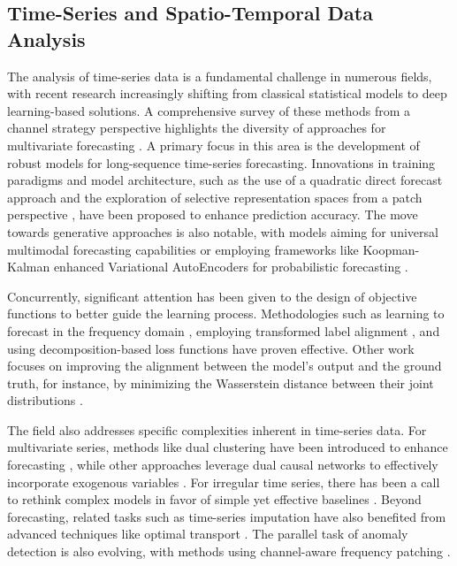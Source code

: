 \subsection{Time-Series and Spatio-Temporal Data Analysis}
The analysis of time-series data is a fundamental challenge in numerous fields, with recent research increasingly shifting from classical statistical models to deep learning-based solutions. A comprehensive survey of these methods from a channel strategy perspective highlights the diversity of approaches for multivariate forecasting \citep{qiu2025comprehensive}. A primary focus in this area is the development of robust models for long-sequence time-series forecasting. Innovations in training paradigms and model architecture, such as the use of a quadratic direct forecast approach \citep{wang2026iclrqdf} and the exploration of selective representation spaces from a patch perspective \citep{wu2025srsnet}, have been proposed to enhance prediction accuracy. The move towards generative approaches is also notable, with models aiming for universal multimodal forecasting capabilities \citep{wu2026aurora} or employing frameworks like Koopman-Kalman enhanced Variational AutoEncoders for probabilistic forecasting \citep{wu2025k2vae}.

Concurrently, significant attention has been given to the design of objective functions to better guide the learning process. Methodologies such as learning to forecast in the frequency domain \citep{wang2025fredf}, employing transformed label alignment \citep{wang2025timeo1}, and using decomposition-based loss functions \citep{qiu2025dbloss} have proven effective. Other work focuses on improving the alignment between the model's output and the ground truth, for instance, by minimizing the Wasserstein distance between their joint distributions \citep{wang2026iclrdistdf}.

The field also addresses specific complexities inherent in time-series data. For multivariate series, methods like dual clustering have been introduced to enhance forecasting \citep{qiu2025duet}, while other approaches leverage dual causal networks to effectively incorporate exogenous variables \citep{qiu2025dag}. For irregular time series, there has been a call to rethink complex models in favor of simple yet effective baselines \citep{liu2025rethinking}. Beyond forecasting, related tasks such as time-series imputation have also benefited from advanced techniques like optimal transport \citep{wang2025optimal}. The parallel task of anomaly detection is also evolving, with methods using channel-aware frequency patching \citep{wu2024catch}.

